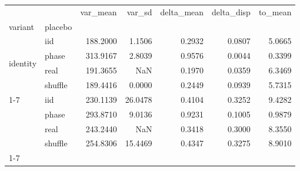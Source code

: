 \begin{tabular}{llrrrrr}
\toprule
 &  & var_mean & var_sd & delta_mean & delta_disp & to_mean \\
variant & placebo &  &  &  &  &  \\
\midrule
\multirow[t]{4}{*}{identity} & iid & 188.2000 & 1.1506 & 0.2932 & 0.0807 & 5.0665 \\
 & phase & 313.9167 & 2.8039 & 0.9576 & 0.0044 & 0.3399 \\
 & real & 191.3655 & NaN & 0.1970 & 0.0359 & 6.3469 \\
 & shuffle & 189.4416 & 0.0000 & 0.2449 & 0.0939 & 5.7315 \\
\cline{1-7}
\multirow[t]{4}{*}{nn} & iid & 230.1139 & 26.0478 & 0.4104 & 0.3252 & 9.4282 \\
 & phase & 293.8710 & 9.0136 & 0.9231 & 0.1005 & 0.9879 \\
 & real & 243.2440 & NaN & 0.3418 & 0.3000 & 8.3550 \\
 & shuffle & 254.8306 & 15.4469 & 0.4347 & 0.3275 & 8.9010 \\
\cline{1-7}
\bottomrule
\end{tabular}
